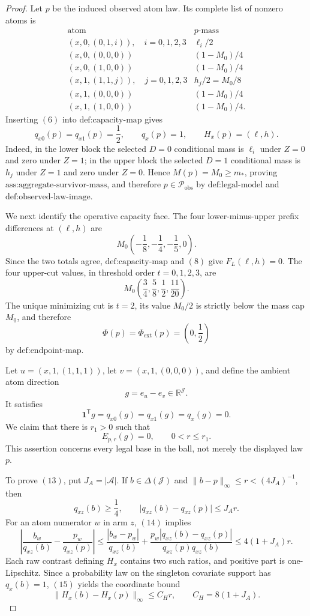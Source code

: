 \documentclass{article}
\begin{document}
\begin{proof}
Let \(p\) be the induced observed atom law.  Its complete list of nonzero atoms is
\[
\begin{array}{c|c}
\text{atom}&p\text{-mass}\\ \hline
(x,0,(0,1,i)),\quad i=0,1,2,3&\ell_i/2\\
(x,0,(0,0,0))&(1-M_0)/4\\
(x,0,(1,0,0))&(1-M_0)/4\\
(x,1,(1,1,j)),\quad j=0,1,2,3&h_j/2=M_0/8\\
(x,1,(0,0,0))&(1-M_0)/4\\
(x,1,(1,0,0))&(1-M_0)/4.
\end{array}
\tag{6}
\]
Inserting \((6)\) into \(\text{def:capacity-map}\) gives
\[
 q_{x0}(p)=q_{x1}(p)=\frac12,\qquad q_x(p)=1,
 \qquad H_x(p)=(\ell,h).
\tag{7}
\]
Indeed, in the lower block the selected \(D=0\) conditional mass is \(\ell_i\) under \(Z=0\) and zero under \(Z=1\); in the upper block the selected \(D=1\) conditional mass is \(h_j\) under \(Z=1\) and zero under \(Z=0\).  Hence \(M(p)=M_0\ge m_*\), proving \(\text{ass:aggregate-survivor-mass}\), and therefore \(p\in\mathcal P_{\mathrm{obs}}\) by \(\text{def:legal-model}\) and \(\text{def:observed-law-image}\).

We next identify the operative capacity face.  The four lower-minus-upper prefix differences at \((\ell,h)\) are
\[
 M_0\left(-\frac18,-\frac14,-\frac15,0\right).
\tag{8}
\]
Since the two totals agree, \(\text{def:capacity-map}\) and \((8)\) give \(F_L(\ell,h)=0\).  The four upper-cut values, in threshold order \(t=0,1,2,3\), are
\[
 M_0\left(\frac34,\frac58,\frac12,\frac{11}{20}\right).
\tag{9}
\]
The unique minimizing cut is \(t=2\), its value \(M_0/2\) is strictly below the mass cap \(M_0\), and therefore
\[
 \Phi(p)=\Phi_{\mathrm{ext}}(p)=\left(0,\frac12\right)
\tag{10}
\]
by \(\text{def:endpoint-map}\).

Let \(u=(x,1,(1,1,1))\), let \(v=(x,1,(0,0,0))\), and define the ambient atom direction
\[
 g=e_u-e_v\in\mathbb R^{\mathcal J}.
\tag{11}
\]
It satisfies
\[
 \mathbf 1^{\mathsf T}g=q_{x0}(g)=q_{x1}(g)=q_x(g)=0.
\tag{12}
\]
We claim that there is \(r_1>0\) such that
\[
 E_{p,r}(g)=0,\qquad 0<r\le r_1.
\tag{13}
\]
This assertion concerns every legal base in the ball, not merely the displayed law \(p\).

To prove \((13)\), put \(J_A=\lvert\mathcal A\rvert\).  If \(b\in\Delta(\mathcal J)\) and \(\lVert b-p\rVert_\infty\le r<(4J_A)^{-1}\), then
\[
 q_{xz}(b)\ge\frac14,
 \qquad
 \lvert q_{xz}(b)-q_{xz}(p)\rvert\le J_A r.
\tag{14}
\]
For an atom numerator \(w\) in arm \(z\), \((14)\) implies
\[
 \left|\frac{b_w}{q_{xz}(b)}-\frac{p_w}{q_{xz}(p)}\right|
 \le \frac{|b_w-p_w|}{q_{xz}(b)}
 +\frac{p_w|q_{xz}(b)-q_{xz}(p)|}{q_{xz}(p)q_{xz}(b)}
 \le4(1+J_A)r.
\tag{15}
\]
Each raw contrast defining \(H_x\) contains two such ratios, and positive part is one-Lipschitz.  Since a probability law on the singleton covariate support has \(q_x(b)=1\), \((15)\) yields the coordinate bound
\[
 \lVert H_x(b)-H_x(p)\rVert_\infty\le C_Hr,
 \qquad C_H=8(1+J_A).
\tag{16}
\]


\end{proof}
\end{document}
